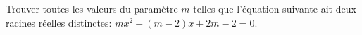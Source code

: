 
\begin{exercice} 
Trouver toutes les valeurs du param\`{e}tre $m$ telles que l'\'equation suivante ait deux racines r\'eelles distinctes: $mx^2+(m-2)x+2m-2=0$.
\end{exercice}
